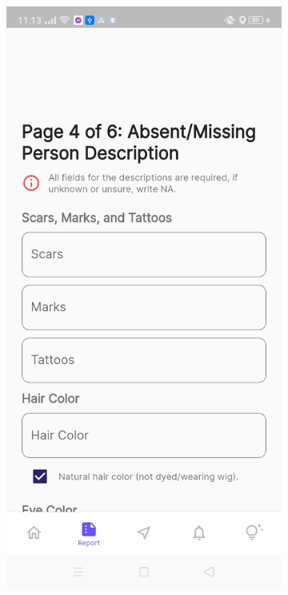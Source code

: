 \begin{figure}[!h]
\begin{subfigure}[c]{0.30\linewidth}
        \includegraphics[scale=0.15]{figures/Chapter4/Main/p4-1.jpg}
    \end{subfigure}
    \centering
    \begin{subfigure}[c]{0.30\linewidth}

\end{subfigure}
\end{figure}
